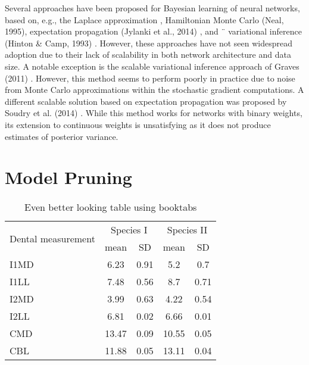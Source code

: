 Several approaches have been proposed for Bayesian learning
of neural networks, based on, e.g., the Laplace approximation \cite{Mackay1991APB}, Hamiltonian Monte Carlo (Neal,
1995), expectation propagation (Jylanki et al., 2014) \cite{Jylanki:2014:EPN:2627435.2638593}, and ¨
variational inference (Hinton & Camp, 1993) \cite{hinton1993keeping}. However,
these approaches have not seen widespread adoption due
to their lack of scalability in both network architecture
and data size. A notable exception is the scalable variational
inference approach of Graves (2011) \cite{graves2011practical}. However, this method seems to perform poorly in practice due to noise
from Monte Carlo approximations within the stochastic
gradient computations. A different scalable solution based
on expectation propagation was proposed by Soudry et al.
(2014) \cite{Soudry}. While this method works for networks with binary
weights, its extension to continuous weights is unsatisfying
as it does not produce estimates of posterior variance.


\section{Model Pruning}




\begin{table}
\caption{Even better looking table using booktabs}
\centering
\label{table:good_table}
\begin{tabular}{l c c c c}
\toprule
\multirow{2}{*}{Dental measurement} & \multicolumn{2}{c}{Species I} & \multicolumn{2}{c}{Species II} \\ 
\cmidrule{2-5}
  & mean & SD  & mean & SD  \\ 
\midrule
I1MD & 6.23 & 0.91 & 5.2  & 0.7  \\

I1LL & 7.48 & 0.56 & 8.7  & 0.71 \\

I2MD & 3.99 & 0.63 & 4.22 & 0.54 \\

I2LL & 6.81 & 0.02 & 6.66 & 0.01 \\

CMD & 13.47 & 0.09 & 10.55 & 0.05 \\

CBL & 11.88 & 0.05 & 13.11 & 0.04\\ 
\bottomrule
\end{tabular}
\end{table}
